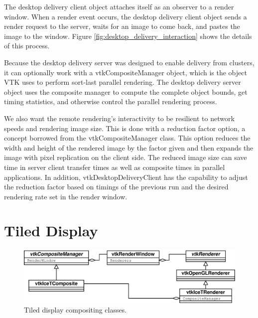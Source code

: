 \documentclass[twocolumn]{article}
\begin{document}
  The desktop delivery client object attaches itself as an observer to a
  render window.  When a render event occurs, the desktop delivery client
  object sends a render request to the server, waits for an image to come
  back, and pastes the image to the window.  Figure
  \vref{fig:desktop_delivery_interaction} shows the details of this
  process.

  Because the desktop delivery server was designed to enable delivery from
  clusters, it can optionally work with a vtkCompositeManager object, which
  is the object VTK uses to perform sort-last parallel rendering.  The
  desktop delivery server object uses the composite manager to compute the
  complete object bounds, get timing statistics, and otherwise control the
  parallel rendering process.

  We also want the remote rendering's interactivity to be resilient to
  network speeds and rendering image size.  This is done with a reduction
  factor option, a concept borrowed from the vtkCompositeManager class.
  This option reduces the width and height of the rendered image by the
  factor given and then expands the image with pixel replication on the
  client side.  The reduced image size can save time in server client
  transfer times as well as composite times in parallel applications.  In
  addition, vtkDesktopDeliveryClient has the capability to adjust the
  reduction factor based on timings of the previous run and the desired
  rendering rate set in the render window.


  \section{Tiled Display}
  \label{sec:tiled_display}

  \begin{figure}
    \begin{center}
      \includegraphics[scale=0.23]{images/IceTCompositeClasses}
    \end{center}
    \caption{Tiled display compositing classes.}
    \label{fig:tiled_display_classes}
  \end{figure}
\end{document}
